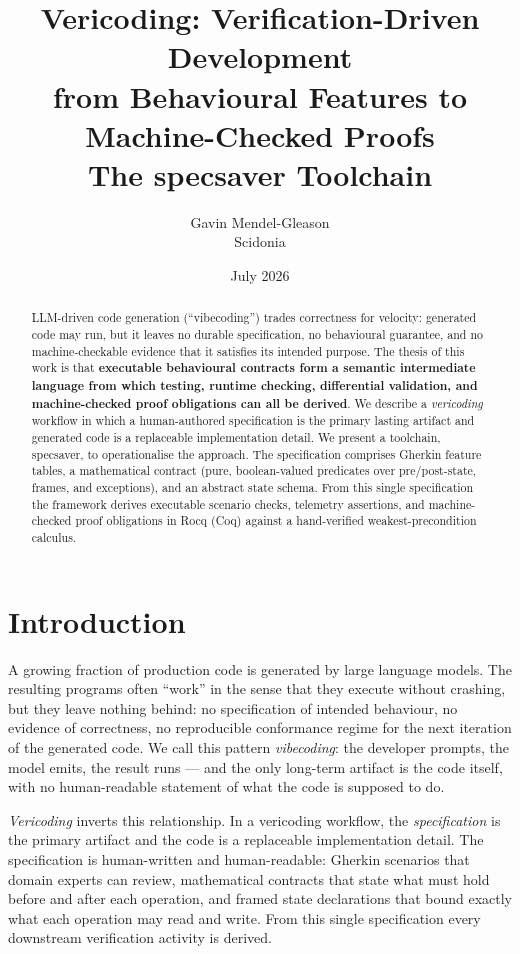 \documentclass[11pt,a4paper]{article}
\title{\textbf{Vericoding: Verification-Driven Development\\
from Behavioural Features to Machine-Checked Proofs}\\[4pt]
\large The \textsf{specsaver} Toolchain}
\author{Gavin Mendel-Gleason\\Scidonia}
\date{July 2026}
\begin{document}
\maketitle

\begin{abstract}
LLM-driven code generation (``vibecoding'') trades correctness for
velocity: generated code may run, but it leaves no durable
specification, no behavioural guarantee, and no machine-checkable
evidence that it satisfies its intended purpose.  The thesis of
this work is that \textbf{executable behavioural contracts form a
semantic intermediate language from which testing, runtime checking,
differential validation, and machine-checked proof obligations can all
be derived}.  We describe a \emph{vericoding} workflow in which a
human-authored specification is the primary lasting artifact and
generated code is a replaceable implementation detail.  We present a
toolchain, \textsf{specsaver}, to operationalise the approach.
The specification comprises Gherkin feature tables, a mathematical
contract (pure, boolean-valued predicates over pre/post-state, frames,
and exceptions), and an abstract state schema.  From this single
specification the framework derives executable scenario checks,
telemetry assertions, and machine-checked proof obligations in Rocq
(Coq) against a hand-verified weakest-precondition calculus.
\end{abstract}

\section{Introduction}\label{sec:intro}

A growing fraction of production code is generated by large language
models.  The resulting programs often ``work'' in the sense that they
execute without crashing, but they leave nothing behind: no
specification of intended behaviour, no evidence of correctness, no
reproducible conformance regime for the next iteration of the
generated code.  We call this pattern \emph{vibecoding}: the developer
prompts, the model emits, the result runs --- and the only long-term
artifact is the code itself, with no human-readable statement of what
the code is supposed to do.

\emph{Vericoding} inverts this relationship.  In a vericoding
workflow, the \emph{specification} is the primary artifact and the
code is a replaceable implementation detail.  The specification is
human-written and human-readable: Gherkin scenarios that domain
experts can review, mathematical contracts that state what must hold
before and after each operation, and framed state declarations that
bound exactly what each operation may read and write.  From this
single specification every downstream verification activity is derived.
\end{document}
